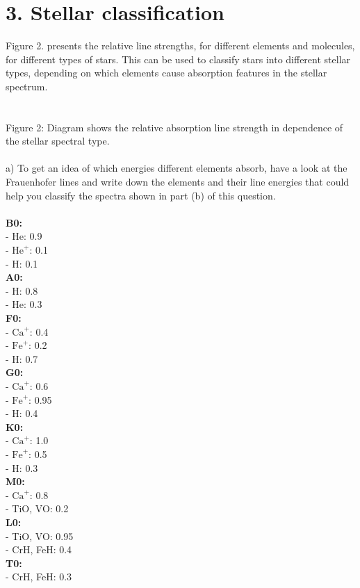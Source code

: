 \section*{3. Stellar classification}

Figure 2. presents the relative line strengths, for different elements and molecules, for different types
of stars. This can be used to classify stars into different stellar types, depending on which elements
cause absorption features in the stellar spectrum.\\
\\

\noindent{}\\
\noindent
Figure 2: Diagram shows the relative absorption line strength in dependence of the stellar spectral 
type.\\
\\
a) To get an idea of which energies different elements absorb, have a look at the Frauenhofer lines and
write down the elements and their line energies that could help you classify the spectra shown in part
(b) of this question.\\
\\
\textbf{B0:}\\
- He: 0.9\\
- $\text{He}^+$: 0.1\\
- H: 0.1\\
\textbf{A0:}\\
- H: 0.8\\
- He: 0.3\\
\textbf{F0:}\\
- $\text{Ca}^+$: 0.4\\
- $\text{Fe}^+$: 0.2\\
- H: 0.7\\
\textbf{G0:}\\
- $\text{Ca}^+$: 0.6\\
- $\text{Fe}^+$: 0.95\\
- H: 0.4\\
\textbf{K0:}\\
- $\text{Ca}^+$: 1.0\\
- $\text{Fe}^+$: 0.5\\
- H: 0.3\\
\textbf{M0:}\\
- $\text{Ca}^+$: 0.8\\
- TiO, VO: 0.2\\
\textbf{L0:}\\
- TiO, VO: 0.95\\
- CrH, FeH: 0.4\\
\textbf{T0:}\\
- CrH, FeH: 0.3\\


